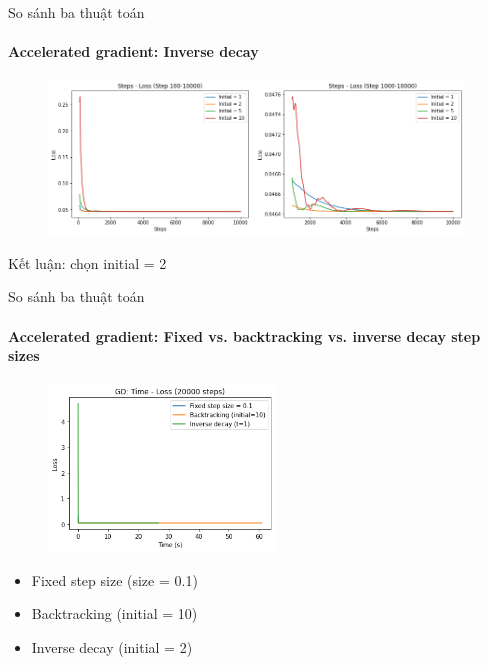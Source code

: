 \documentclass[10pt]{beamer}
\theoremstyle{remark}
\theoremstyle{definition}
\begin{document}
\begin{frame}{So sánh ba thuật toán}
	\framesubtitle{Accelerated gradient: Inverse decay}

	\begin{figure}[h!]
		\centering
		\includegraphics[width=11cm]{Thinh/22.png}
	\end{figure}
	Kết luận: chọn initial = 2
\end{frame}

\begin{frame}{So sánh ba thuật toán}
	\framesubtitle{Accelerated gradient: Fixed vs. backtracking vs. inverse decay step sizes }
	\begin{figure}[h!]
		\centering
		\includegraphics[width=6cm]{Thinh/23.png}
	\end{figure}
	\begin{itemize}
		\item Fixed step size (size = 0.1)
		\item Backtracking (initial = 10)
		\item Inverse decay (initial = 2)

	\end{itemize}
\end{frame}
\end{document}
